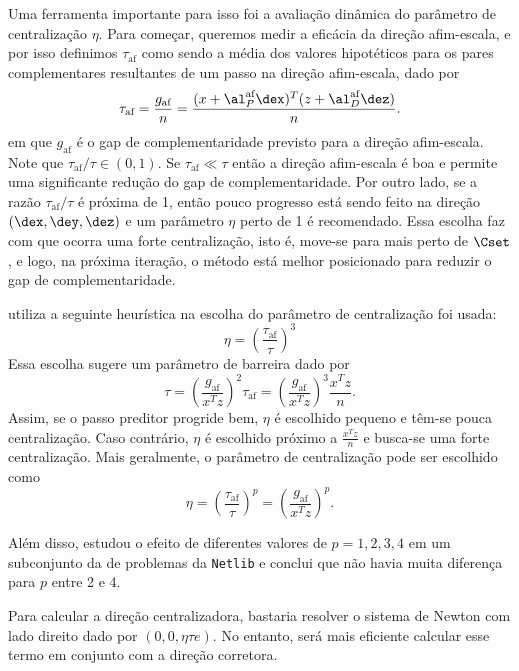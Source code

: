 Uma ferramenta importante para isso foi a avaliação dinâmica do parâmetro de
centralização $\eta$. Para começar, queremos medir a eficácia da direção
afim-escala, e por isso definimos $\tau_{\text{af}}$ como sendo a média dos valores
hipotéticos para os pares complementares resultantes de um passo na direção
afim-escala, dado por 
\begin{equation}
\label{eq:tau-affine}
 \tau_{\text{af}} = \frac{g_{\text{af}}}{n} = \frac{(x+\al_P^{\text{af}}\dex)^T
(z+\al_D^{\text{af}}\dez)}{n}.
\end{equation}
em que $g_{\text{af}}$ é o gap de complementaridade previsto para a direção afim-escala.
Note que $\tau_{\text{af}}/\tau\in(0,1)$. Se $\tau_{\text{af}}\ll\tau$ então a direção afim-escala é
boa e permite uma significante redução do gap de complementaridade. Por outro
lado, se a razão $\tau_{\text{af}}/\tau$ é próxima de 1, então pouco progresso está sendo
feito na direção  $(\dex, \dey, \dez)$ e um parâmetro $\eta$ perto de 1 é
recomendado. Essa escolha faz com que ocorra uma forte centralização, isto é,
move-se para mais perto de $\Cset$, e logo, na próxima iteração, o método está
melhor posicionado para reduzir o gap de complementaridade.

 \citet{Mehrotra:1992wr} utiliza a seguinte heurística na escolha do parâmetro
 de centralização foi usada:
\begin{equation}\label{eq:Mehrotra-centralizer-parameter}
\eta = \left(\frac{\tau_{\text{af}}}{\tau}\right)^3
\end{equation}
Essa escolha sugere um parâmetro de barreira dado por 
\begin{equation}\label{eq:Mehrotra-barrier-parameter}
\tau = \left(\frac{g_{\text{af}}}{x^Tz}\right)^2\tau_{\text{af}} =
\left(\frac{g_{\text{af}}}{x^Tz}\right)^3\frac{x^Tz}{n}.
\end{equation}
Assim, se o passo preditor progride bem, $\eta$ é escolhido pequeno e têm-se
pouca centralização. Caso contrário, $\eta$ é escolhido próximo a $\frac{x^Tz}{n}$ e busca-se
uma forte centralização. Mais geralmente, o parâmetro de
centralização pode ser escolhido como
\[
\eta = \left(\frac{\tau_{\text{af}}}{\tau}\right)^p = \left(\frac{g_{\text{af}}}{x^Tz}\right)^p.
\]

Além disso, \citet{Mehrotra:1992wr} estudou o efeito de diferentes valores de
$p= 1,2,3,4$ em um subconjunto da de problemas da \texttt{Netlib} e conclui que não havia
 muita diferença para $p$ entre 2 e 4.

Para calcular a direção centralizadora, bastaria resolver o sistema de Newton
com lado direito dado por $(0,0,\eta \tau e)$. No entanto, será mais eficiente
calcular esse termo em conjunto com a direção corretora. 

